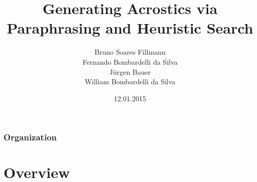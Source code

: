 \documentclass{beamer}
\title[Generating Acrostics via Paraphrasing and Heuristic Search]{Generating Acrostics via Paraphrasing and Heuristic Search} %
\author[Bruno, Fernando, Jürgen, William]{Bruno Soares Fillmann\\
Fernando Bombardelli da Silva\\
Jürgen Bauer\\
William Bombardelli da Silva
} %
\institute[TU Berlin] %
{
Technische Universität Berlin \\ %
Datenbanksysteme und Informationsmanagement \\
DBPRO – Database Projects (WS 2014/2015) \\
\medskip
}
\date{12.01.2015} %
\begin{document}
\begin{frame}
\titlepage %
\end{frame}

\begin{frame}
\frametitle{Organization} %
\tableofcontents %
\end{frame}


\section{Overview} %

\end{document}
